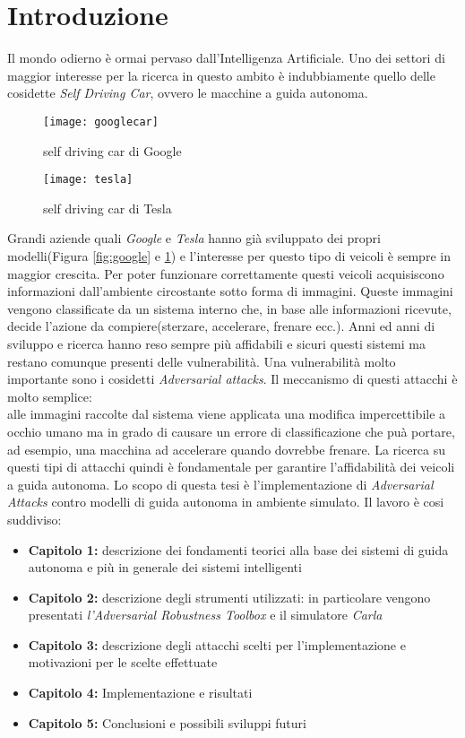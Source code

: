 \chapter*{Introduzione}
Il mondo odierno è ormai pervaso dall'Intelligenza Artificiale. Uno dei settori di maggior interesse per la
ricerca in questo ambito è indubbiamente quello delle cosidette \emph{Self Driving Car}, ovvero
le macchine a guida autonoma. 
\begin{figure}
  \centering
  \parbox{5cm}{
  \texttt{[image: googlecar]}
  \caption{self driving car di Google}
  \label{fig:google}}
  \qquad
  \begin{minipage}{5cm}
  \texttt{[image: tesla]}
  \caption{self driving car di Tesla}
  \label{fig:tesla}
  \end{minipage}
  \end{figure}
Grandi aziende quali \emph{Google} e \emph{Tesla} hanno già sviluppato
dei propri modelli(Figura \ref{fig:google} e \ref{fig:tesla}) e l'interesse per questo tipo di veicoli è sempre in  maggior crescita.
Per poter funzionare correttamente questi veicoli acquisiscono informazioni dall'ambiente circostante sotto forma di immagini.
Queste immagini vengono classificate da un sistema interno che, in base alle informazioni ricevute, decide l'azione da compiere(sterzare, accelerare, frenare ecc.).
Anni ed anni di sviluppo e ricerca hanno reso sempre più affidabili e sicuri  questi sistemi ma restano comunque presenti delle vulnerabilità. Una vulnerabilità
molto importante sono i cosidetti \emph{Adversarial attacks}. Il meccanismo di questi attacchi è molto semplice:
\\
alle immagini raccolte dal sistema viene applicata una modifica impercettibile a occhio umano ma in grado di causare un errore di classificazione che puà portare, ad esempio, una macchina ad accelerare quando
dovrebbe frenare. La ricerca su questi tipi di attacchi quindi è fondamentale per garantire l'affidabilità dei veicoli a guida autonoma.
Lo scopo di questa tesi è l'implementazione di \emph{Adversarial Attacks} contro modelli di guida autonoma in ambiente simulato.
Il lavoro è cosi suddiviso:
\begin{itemize}
  \item \textbf{Capitolo 1:} descrizione dei fondamenti teorici alla base dei sistemi di guida autonoma e più in generale dei sistemi intelligenti
  \item \textbf{Capitolo 2:} descrizione degli strumenti utilizzati: in particolare vengono presentati \emph{l'Adversarial Robustness Toolbox} e il simulatore \emph{Carla}
  \item \textbf{Capitolo 3:} descrizione degli attacchi scelti per l'implementazione e  motivazioni per le scelte effettuate
  \item \textbf{Capitolo 4:} Implementazione e risultati
  \item \textbf{Capitolo 5:} Conclusioni e possibili sviluppi futuri
  
\end{itemize}


